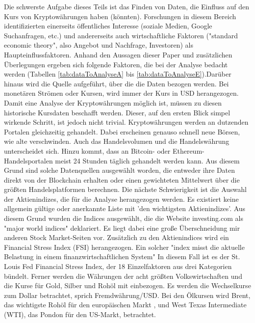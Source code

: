 Die schwerste Aufgabe dieses Teils ist das Finden von Daten, die Einfluss auf den Kurs von Kryptowährungen haben (könnten). Forschungen in diesem Bereich identifizierten einerseits öffentliches Interesse (soziale Medien, Google Suchanfragen, etc.) und andererseits auch wirtschaftliche Faktoren ("standard economic theory", also Angebot und Nachfrage, Investoren)\citep{kristoufek_what_2015} als Haupteinflussfaktoren. Anhand den Aussagen dieser Paper und zusätzlichen Überlegungen ergeben sich folgende Faktoren, die bei der Analyse bedacht werden (Tabellen \ref{tab:dataToAnalyseA} bis \ref{tab:dataToAnalyseE}).\newline Darüber hinaus wird die Quelle aufgeführt, über die die Daten bezogen werden. Bei monetären Strömen oder Kursen, wird immer der Kurs in USD herangezogen. 
\newline
Damit eine Analyse der Kryptowährungen möglich ist, müssen zu diesen historische Kursdaten beschafft werden. Dieser, auf den ersten Blick simpel wirkende Schritt, ist jedoch nicht trivial. Kryptowährungen werden an dutzenden Portalen gleichzeitig gehandelt. Dabei erscheinen genauso schnell neue Börsen, wie alte verschwinden. Auch das Handelsvolumen und die Handelswährung unterscheidet sich. Hinzu kommt, dass an Bitcoin- oder Ethereum-Handelsportalen meist 24 Stunden täglich gehandelt werden kann. Aus diesem Grund sind solche Datenquellen ausgewählt worden, die entweder ihre Daten direkt von der Blockchain erhalten oder einen gewichteten Mittelwert über die größten Handelsplatformen berechnen.
\newline
Die nächste Schwierigkeit ist die Auswahl der Aktienindizes, die für die Analyse herangezogen werden. Es existiert keine allgemein gültige oder anerkannte Liste mit 'den wichtigsten Aktienindizes'. Aus diesem Grund wurden die Indices ausgewählt, die die Website investing.com als "major world indices" deklariert.\citep{fusion_media_limited_major_2017} Es liegt dabei eine große Überschneidung mir anderen Stock Market-Seiten vor. Zusätzlich zu den Aktienindices wird ein Financial Stress Index (FSI) herangezogen. Ein solcher "index misst die aktuelle Belastung in einem finanzwirtschaftlichen System"\citep[S.~1; eigene Übersetzung]{vermeulen_financial_2014} In diesem Fall ist es der St. Louis Fed Financial Stress Index, der 18 Einzelfaktoren aus drei Kategorien bündelt.\citep{federal_reserve_bank_of_st._louis_st._2017}
\newline
Ferner werden die Währungen der acht größten Volkswirtschaften\citep{the_international_monetary_fund_world_2017} und die Kurse für Gold, Silber und Rohöl mit einbezogen. Es werden die Wechselkurse zum Dollar betrachtet, sprich Fremdwährung/USD. Bei den Ölkursen wird Brent, das wichtigste Rohöl für den europäischen Markt \citep{noauthor_brent_2016}, und West Texas Intermediate (WTI), das Pondon für den US-Markt, betrachtet\citep{noauthor_west_2017}.

